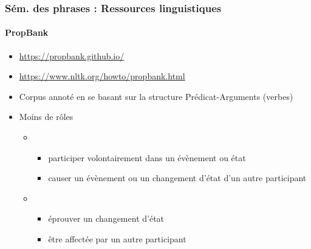 \documentclass[xcolor=table]{beamer}
\begin{document}
\begin{frame}
\frametitle{Sém. des phrases : Ressources linguistiques}
\framesubtitle{PropBank}
	
\begin{itemize}
	\item {\scriptsize \url{https://propbank.github.io/}}
	\item {\scriptsize \url{https://www.nltk.org/howto/propbank.html}}
	\item Corpus annoté en se basant sur la structure Prédicat-Arguments (verbes)
	\item Moins de rôles 
	\begin{itemize}
		\item {}
		\begin{itemize}
			\item participer volontairement dans un évènement ou état
			\item causer un évènement ou un changement d'état d'un autre participant
		\end{itemize}
		\item {}
		\begin{itemize}
			\item éprouver un changement d'état
			\item être affectée par un autre participant
		\end{itemize}
	\end{itemize}
\end{itemize}

%	
%	
	
\end{frame}
\end{document}
